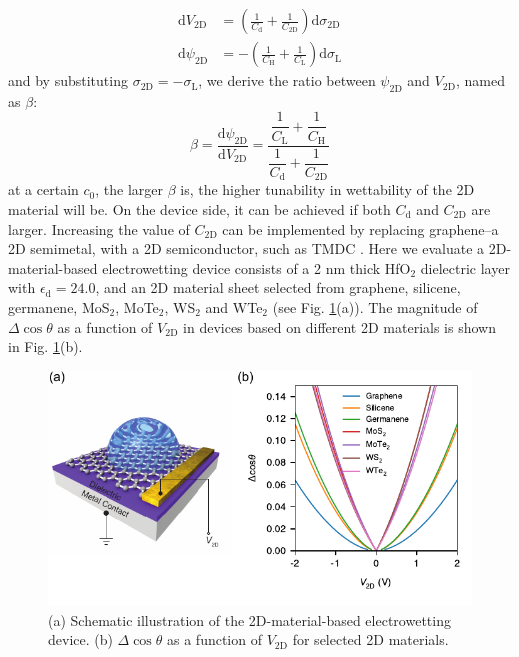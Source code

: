 \documentclass[journal=ancac3,manuscript=article,email=true]{achemso}
\begin{document}
\begin{align}
\label{eqn:dV-sigma-2D}
\mathrm{d} V_{\mathrm{2D}} &= \left(\frac{1}{C_{\mathrm{d}}} +
\frac{1}{C_{\mathrm{2D}}}\right) \mathrm{d}\sigma_{\mathrm{2D}} \\
\label{eqn:dpsi-sigma-L}
\mathrm{d} \psi_{\mathrm{2D}} &= -\left( \frac{1}{C_{\mathrm{H}}}
+ \frac{1}{C_{\mathrm{L}}} \right) \mathrm{d}\sigma_{\mathrm{L}}
\end{align}
and by substituting \(\sigma_{\mathrm{2D}} = -\sigma_{\mathrm{L}}\), we derive the ratio between \(\psi_{\mathrm{2D}}\) and \(V_{\mathrm{2D}}\), named as \(\beta\):
\begin{equation}
\label{eqn:beta}
\beta = \frac{\mathrm{d} \psi_{\mathrm{2D}}}{\mathrm{d}
V_{\mathrm{2D}}} = \dfrac{\dfrac{1}{C_{\mathrm{L}}} +
\dfrac{1}{C_{\mathrm{H}}}}{\dfrac{1}{C_{\mathrm{d}}} + \dfrac{1}{C_{\mathrm{2D}}}}
\end{equation}
at a certain \(c_{0}\), the larger \(\beta\) is, the higher tunability in
wettability of the 2D material will be. On the device side, it can be
achieved if both \(C_{\mathrm{d}}\) and \(C_{\mathrm{2D}}\) are
larger. Increasing the value of \(C_{\mathrm{2D}}\) can be implemented
by replacing graphene--a 2D semimetal, with a 2D semiconductor, such
as TMDC \cite{tian_multiscale_2016}. Here we evaluate a
2D-material-based electrowetting device consists of a 2 nm thick HfO\(_{\text{2}}\)
dielectric layer with \(\epsilon_{\mathrm{d}}=24.0\), and an 2D material
sheet selected from graphene, silicene, germanene, MoS\(_{\text{2}}\), MoTe\(_{\text{2}}\), WS\(_{\text{2}}\)
and WTe\(_{\text{2}}\) (see Fig. \ref{fig:dcos-all-2D}(a)). The magnitude of \(\Delta
\cos \theta\) as a function of \(V_{\mathrm{2D}}\) in devices based on
different 2D materials is shown in Fig. \ref{fig:dcos-all-2D}(b).
\begin{figure}[htbp]
\centering
\includegraphics[width=0.95\linewidth]{../img/dcos-all-2D.pdf}
\caption{\label{fig:dcos-all-2D}
(a) Schematic illustration of the 2D-material-based electrowetting device. (b) \(\Delta\cos\theta\) as a function of \(V_{\mathrm{2D}}\) for selected 2D materials.}
\end{figure}
\end{document}
